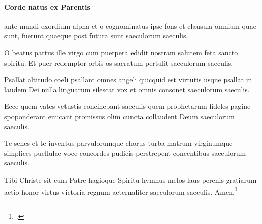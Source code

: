 \paragraph{Corde natus ex Parentis}
ante mundi exordium
alpha et o cognominatus
ipse fons et clausula
omnium quae sunt, fuerunt
quaeque post futura sunt
saeculorum saeculis.

O beatus partus ille
virgo cum puerpera
edidit nostram salutem
feta sancto spiritu.
Et puer redemptor orbis
os sacratum pertulit
saeculorum saeculis.

Psallat altitudo coeli
psallant omnes angeli
quicquid est virtutis
usque psallat in laudem Dei
nulla linguarum silescat
vox et omnis consonet
saeculorum saeculis.

Ecce quem vates vetustis
concinebant saeculis
quem prophetarum fideles
pagine spoponderant emicant
promissus olim
cuncta collaudent Deum
saeculorum saeculis.

Te senes et te iuventus
parvulorumque chorus
turba matrum virginumque
simplices puellulae
voce concordes
pudicis perstrepent concentibus
saeculorum saeculis.

Tibi Christe sit cum Patre
hagioque Spiritu
hymnus melos laus perenis
gratiarum actio
honor virtus victoria
regnum aeternaliter
saeculorum saeculis.
Amen.\footcite[68r]{bp1502}
